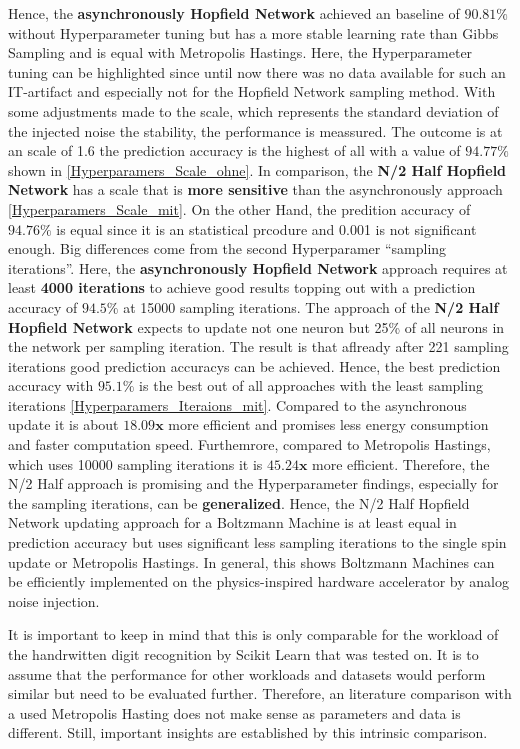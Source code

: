 Hence, the \textbf{asynchronously Hopfield Network} achieved an baseline of \(\mathbf{90.81\%}\) without Hyperparameter tuning but has a more stable  learning rate than Gibbs Sampling and
is equal with Metropolis Hastings.
Here, the Hyperparameter tuning can be highlighted since until now there was no data available for such an \ac{IT}-artifact and especially not for the Hopfield Network sampling method.
With some adjustments made to the scale, which represents the standard deviation of the injected noise the stability, the performance is meassured.
The outcome is at an scale of 1.6 the prediction accuracy is the highest of all with a value of \(\mathbf{94.77\%}\) shown in \ref{Hyperparamers_Scale_ohne}.
In comparison, the \textbf{N/2 Half Hopfield Network} has a scale that is \textbf{ more sensitive} than the asynchronously approach \ref{Hyperparamers_Scale_mit}.
On the other Hand, the predition accuracy of \(\mathbf{94.76\%}\) is equal since it is an statistical prcodure and 0.001 is not significant enough.
Big differences come from the second Hyperparamer ``sampling iterations''. 
Here, the \textbf{asynchronously Hopfield Network} approach requires at least \textbf{4000 iterations} to achieve good results topping out with
a prediction accuracy of \(\mathbf{94.5\%}\) at 15000 sampling iterations. The approach of the
\textbf{N/2 Half Hopfield Network} expects to update not one neuron but 25\% of all neurons in the network per sampling iteration. 
The result is that aflready after 221 sampling iterations good prediction accuracys can be achieved.
Hence, the best prediction accuracy with \(\mathbf{95.1\%}\) is the best out of all approaches with the least sampling iterations \ref{Hyperparamers_Iteraions_mit}.
Compared to the asynchronous update it is about \(\mathbf{18.09x}\) more efficient and promises less energy consumption and faster computation speed. 
Furthemrore, compared to Metropolis Hastings, which uses 10000 sampling iterations it is \(\mathbf{45.24x}\) more efficient.
Therefore, the N/2 Half approach is promising and the Hyperparameter findings, especially for the sampling iterations, can be \textbf{generalized}.
Hence, the N/2 Half Hopfield Network updating approach for a Boltzmann Machine is at least equal in prediction accuracy but uses significant less sampling iterations to the single spin update or Metropolis Hastings.
In general, this shows Boltzmann Machines can be efficiently implemented on the physics-inspired hardware accelerator by analog noise injection. 

It is important to keep in mind that this is only comparable for the workload of the handrwitten digit recognition by Scikit Learn that was tested on. 
It is to assume that the performance for other workloads and datasets would perform similar but need to be evaluated further. 
Therefore, an literature comparison with a used Metropolis Hasting does not make sense as parameters and data is different. 
Still, important insights are established by this intrinsic comparison. 

